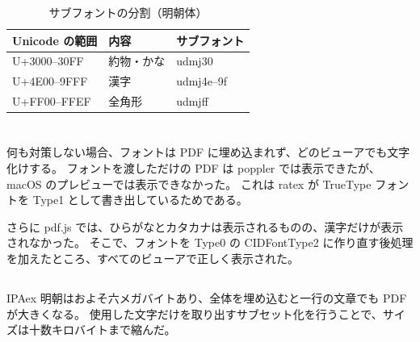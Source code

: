 \begin{table}[h]
\centering
\begin{tabular}{lll}
\hline
\textbf{Unicode の範囲} & 内容 & サブフォント \\
\hline
U+3000--30FF & 約物・かな & udmj30 \\
U+4E00--9FFF & 漢字 & udmj4e--9f \\
U+FF00--FFEF & 全角形 & udmjff \\
\hline
\end{tabular}
\caption{サブフォントの分割（明朝体）}
\end{table}

\section{}
\subsection{}
何も対策しない場合、フォントは PDF に埋め込まれず、どのビューアでも文字化けする。
フォントを渡しただけの PDF は poppler では表示できたが、macOS のプレビューでは表示できなかった。
これは ratex が TrueType フォントを Type1 として書き出しているためである。

さらに pdf.js では、ひらがなとカタカナは表示されるものの、漢字だけが表示されなかった。
そこで、フォントを Type0 の CIDFontType2 に作り直す後処理を加えたところ、すべてのビューアで正しく表示された。

\subsection{}
IPAex 明朝はおよそ六メガバイトあり、全体を埋め込むと一行の文章でも PDF が大きくなる。
使用した文字だけを取り出すサブセット化を行うことで、サイズは十数キロバイトまで縮んだ。

